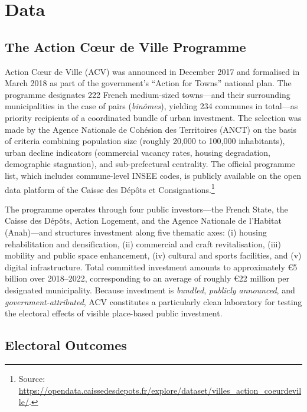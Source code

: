 
\section{Data}
\label{sec:data}

\subsection{The Action C\oe ur de Ville Programme}

Action C\oe ur de Ville (ACV) was announced in December 2017 and formalised in March 2018 as part of the government's ``Action for Towns'' national plan. The programme designates 222 French medium-sized towns---and their surrounding municipalities in the case of pairs (\textit{binômes}), yielding 234 communes in total---as priority recipients of a coordinated bundle of urban investment. The selection was made by the Agence Nationale de Cohésion des Territoires (ANCT) on the basis of criteria combining population size (roughly 20{,}000 to 100{,}000 inhabitants), urban decline indicators (commercial vacancy rates, housing degradation, demographic stagnation), and sub-prefectural centrality. The official programme list, which includes commune-level INSEE codes, is publicly available on the open data platform of the Caisse des Dépôts et Consignations.\footnote{Source: \url{https://opendata.caissedesdepots.fr/explore/dataset/villes\_action\_coeurdeville/}.}

The programme operates through four public investors---the French State, the Caisse des Dépôts, Action Logement, and the Agence Nationale de l'Habitat (Anah)---and structures investment along five thematic axes: (i) housing rehabilitation and densification, (ii) commercial and craft revitalisation, (iii) mobility and public space enhancement, (iv) cultural and sports facilities, and (v) digital infrastructure. Total committed investment amounts to approximately \euro{}5 billion over 2018--2022, corresponding to an average of roughly \euro{}22 million per designated municipality. Because investment is \emph{bundled}, \emph{publicly announced}, and \emph{government-attributed}, ACV constitutes a particularly clean laboratory for testing the electoral effects of visible place-based public investment.

\subsection{Electoral Outcomes}

